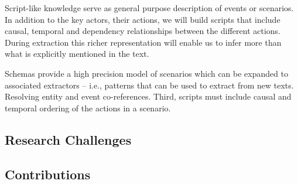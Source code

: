 
Script-like knowledge serve as general purpose description of events or scenarios. In addition to the key actors, their actions, we will build scripts that include causal, temporal and dependency relationships between the different actions. During extraction this richer representation will enable us to infer more than what is explicitly mentioned in the text. 

Schemas provide a high precision model of scenarios which can be expanded to associated extractors -- i.e., patterns that can be used to extract from new texts. Resolving entity and event co-references. Third, scripts must include causal and temporal ordering of the actions in a scenario. 

\subsection{Research Challenges}



\subsection{Contributions}
